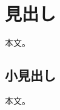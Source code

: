 \documentclass[twocolumn, 10pt]{ujarticle}
\begin{document}
\maketitle

\section{見出し}
本文。

\subsection{小見出し}
本文。


\end{document}
